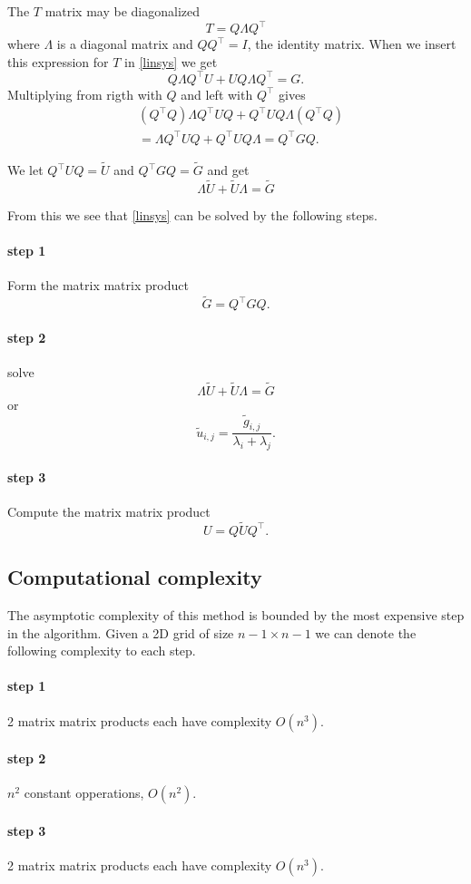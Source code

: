 \documentclass{article}
\begin{document}
The $T$ matrix may be diagonalized
\[
T = Q \Lambda Q^\top
\]
where $\Lambda$ is a diagonal matrix and $Q Q^\top=I$, the identity matrix.
When we insert this expression for $T$ in \eqref{linsys} we get
\[
Q \Lambda Q^\top U + U Q \Lambda Q^\top = G.
\]
Multiplying from rigth with $Q$ and left with $Q^\top$ gives
\begin{align*}
&(Q^\top Q) \Lambda Q^\top U Q + Q^\top U Q \Lambda (Q^\top Q)\\
&= \Lambda Q^\top U Q + Q^\top U Q \Lambda = Q^\top G Q.
\end{align*}

We let $Q^\top U Q = \tilde{U}$ and $Q^\top G Q = \tilde{G}$ and get
\[
\Lambda \tilde{U} + \tilde{U} \Lambda = \tilde{G}
\]

From this we see that \eqref{linsys} can be solved by the following steps.
\paragraph{step 1}
Form the matrix matrix product
\[
\tilde{G} = Q^\top G Q.
\]
\paragraph{step 2}
solve
\[
\Lambda \tilde{U} + \tilde{U} \Lambda = \tilde{G}
\]
or
\[
\tilde{u}_{i,j} = \frac{\tilde{g}_{i,j}}{\lambda_i + \lambda_j}.
\]
\paragraph{step 3}
Compute the matrix matrix product
\[
U = Q \tilde{U} Q^\top.
\]

\subsection{Computational complexity}
The asymptotic complexity of this method is bounded by the most expensive step
in the algorithm.
Given a 2D grid of size $n-1 \times n-1$ we can denote the following complexity to each step.
\paragraph{step 1}
2 matrix matrix products each have complexity $O(n^3)$.
\paragraph{step 2}
$n^2$ constant opperations, $O(n^2)$.
\paragraph{step 3}
2 matrix matrix products each have complexity $O(n^3)$.
\end{document}
